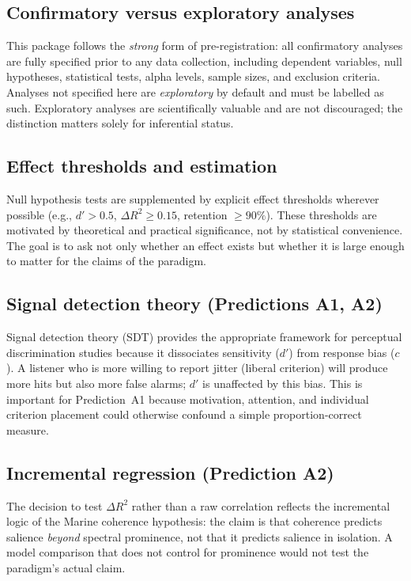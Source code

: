 \documentclass[11pt, a4paper]{article}
\begin{document}
\subsection{Confirmatory versus exploratory analyses}

This package follows the \emph{strong} form of pre-registration: all confirmatory
analyses are fully specified prior to any data collection, including dependent
variables, null hypotheses, statistical tests, alpha levels, sample sizes, and
exclusion criteria.  Analyses not specified here are \emph{exploratory} by default
and must be labelled as such.  Exploratory analyses are scientifically valuable and
are not discouraged; the distinction matters solely for inferential status.

\subsection{Effect thresholds and estimation}

Null hypothesis tests are supplemented by explicit effect thresholds wherever
possible (e.g., $d' > 0.5$, $\Delta R^2 \geq 0.15$, retention $\geq 90\%$).
These thresholds are motivated by theoretical and practical significance, not by
statistical convenience.  The goal is to ask not only whether an effect exists but
whether it is large enough to matter for the claims of the paradigm.

\subsection{Signal detection theory (Predictions A1, A2)}

Signal detection theory (SDT) provides the appropriate framework for perceptual
discrimination studies because it dissociates sensitivity ($d'$) from response bias
($c$).  A listener who is more willing to report jitter (liberal criterion) will
produce more hits but also more false alarms; $d'$ is unaffected by this bias.
This is important for Prediction~A1 because motivation, attention, and individual
criterion placement could otherwise confound a simple proportion-correct measure.

\subsection{Incremental regression (Prediction A2)}

The decision to test $\Delta R^2$ rather than a raw correlation reflects the
incremental logic of the Marine coherence hypothesis: the claim is that coherence
predicts salience \emph{beyond} spectral prominence, not that it predicts salience
in isolation.  A model comparison that does not control for prominence would not
test the paradigm's actual claim.
\end{document}
